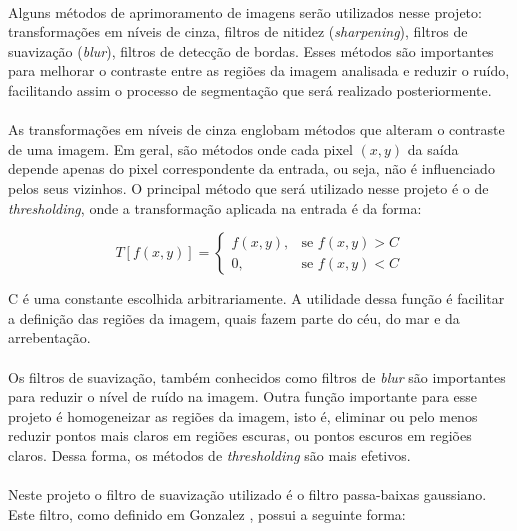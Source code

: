 \paragraph{}Alguns métodos de aprimoramento de imagens serão utilizados nesse projeto: transformações em níveis de cinza, filtros de nitidez (\textit{sharpening}), filtros de suavização (\textit{blur}), filtros de detecção de bordas. Esses métodos são importantes para melhorar o contraste entre as regiões da imagem analisada e reduzir o ruído, facilitando assim o processo de segmentação que será realizado posteriormente.

\paragraph{}As transformações em níveis de cinza englobam métodos que alteram o contraste de uma imagem. Em geral, são métodos onde cada pixel \((x,y)\) da saída depende apenas do pixel correspondente da entrada, ou seja, não é influenciado pelos seus vizinhos. O principal método que será utilizado nesse projeto é o de \textit{thresholding}, onde a transformação aplicada na entrada é da forma: 

\[
T[f(x,y)] =
\begin{cases}
        f(x,y), & \text{se } f(x,y) > C\\
        0, & \text{se } f(x,y) < C
\end{cases}
\] 

\noindentonde C é uma constante escolhida arbitrariamente. A utilidade dessa função é facilitar a definição das regiões da imagem, quais fazem parte do céu, do mar e da arrebentação.

\paragraph{}Os filtros de suavização, também conhecidos como filtros de \textit{blur} são importantes para reduzir o nível de ruído na imagem. Outra função importante para esse projeto é homogeneizar as regiões da imagem, isto é, eliminar ou pelo menos reduzir pontos mais claros em regiões escuras, ou pontos escuros em regiões claros. Dessa forma, os métodos de 
\textit{thresholding} são mais efetivos.

\paragraph{}Neste projeto o filtro de suavização utilizado é o filtro passa-baixas gaussiano. Este filtro, como definido em Gonzalez \cite{Gonzalez92}, possui a seguinte forma:

